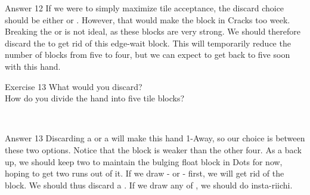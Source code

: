 \newpage

\begin{itembox}[r]{Answer 12}
\emj
If we were to simply maximize tile acceptance, the discard choice should be either {\large{}} or {\large\rfw}. However, that would make the block in Cracks too week. Breaking the {\large{}} or {\large{}} is not ideal, as these blocks are very strong. We should therefore discard the {\large{}} to get rid of this edge-wait block. This will temporarily reduce the number of blocks from five to four, but we can expect to get back to five soon with this hand. 
\end{itembox}

\vfill

\begin{itembox}[l]{Exercise 13}
What would you discard? \\
\vsp
How do you divide the hand into five tile blocks? 

\vspace{-30pt}
\bp
{}\\ \vspace{-18pt}
\rfw{}
\ep
\end{itembox}

\newpage

\begin{itembox}[r]{Answer 13}
\emj
Discarding a {\large{}} or a {\large{}} will make this hand 1-Away, so our choice is between these two options. Notice that the {\large{}} block is weaker than the other four. As a back up, we should keep two {\large{}} to maintain the bulging float block in Dots for now, hoping to get two runs out of it. If we draw {\large{}-} or {\large{}-} first, we will get rid of the {\large{}} block. We should thus discard a {\large{}}. If we draw any of {\large{}}, we should do insta-{\jap riichi}. 
\end{itembox}

